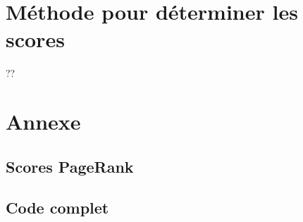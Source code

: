 \documentclass[10pt,a4paper]{article}
\begin{document}
\section{Méthode pour déterminer les scores}
??

\section{Annexe}
\subsection{Scores PageRank}

\subsection{Code complet}
\end{document}
